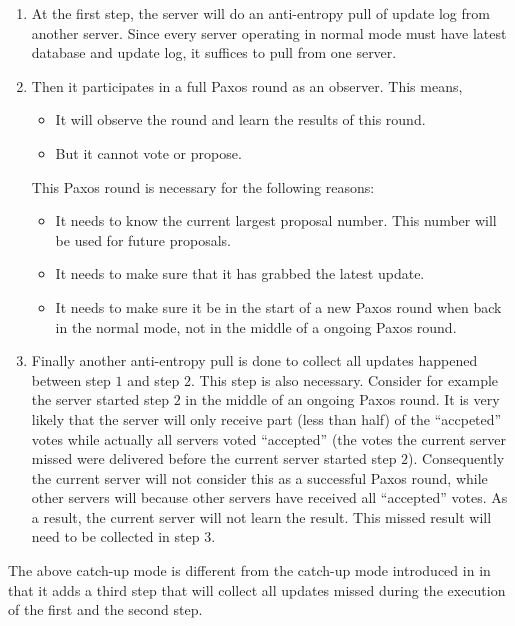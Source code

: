 \documentclass[11pt]{article}
\begin{document}
\begin{enumerate}
    \item At the first step, the server will do an anti-entropy pull of update log from another server.
        Since every server operating in normal mode must have latest database and update log, it suffices to pull from one server.
    \item Then it participates in a full Paxos round as an observer.
        This means,
        \begin{itemize}
            \item It will observe the round and learn the results of this round.
            \item But it cannot vote or propose.
        \end{itemize}
        This Paxos round is necessary for the following reasons:
        \begin{itemize}
            \item It needs to know the current largest proposal number.
                This number will be used for future proposals.
            \item It needs to make sure that it has grabbed the latest update.
            \item It needs to make sure it be in the start of a new Paxos round when back in the normal mode, not in the middle of a ongoing Paxos round.
        \end{itemize}
    \item Finally another anti-entropy pull is done to collect all updates happened between step $1$ and step $2$.
        This step is also necessary.
        Consider for example the server started step $2$ in the middle of an ongoing Paxos round.
        It is very likely that the server will only receive part (less than half) of the ``accpeted'' votes while actually all servers voted ``accepted'' (the votes the current server missed were delivered before the current server started step $2$).
        Consequently the current server will not consider this as a successful Paxos round, while other servers will because other servers have received all ``accepted'' votes.
        As a result, the current server will not learn the result.
        This missed result will need to be collected in step $3$.
\end{enumerate}
The above catch-up mode is different from the catch-up mode introduced in \cite{paxos2} in that it adds a third step that will collect all updates missed during the execution of the first and the second step.
\end{document}
